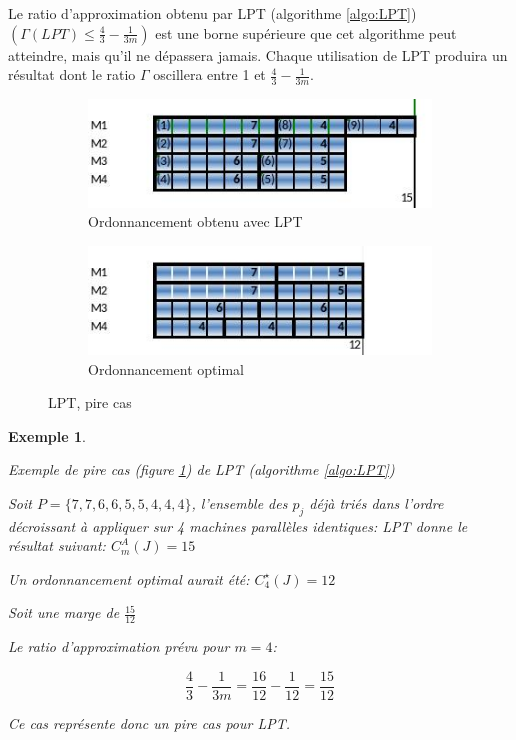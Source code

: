 \documentclass[a4paper,12pt]{report}
\theoremstyle{plain}				%
\newtheorem{example}{Exemple}
\theoremstyle{definition}				%
\begin{document}
Le ratio d'approximation obtenu par LPT (algorithme \ref{algo:LPT})
$(\Gamma(LPT)\leq \frac{4}{3} - \frac{1}{3m})$ est une borne
supérieure que cet algorithme peut atteindre, mais qu'il ne dépassera
jamais.
Chaque utilisation de LPT produira un résultat dont le ratio $\Gamma$
oscillera entre 1 et $\frac{4}{3} - \frac{1}{3m}$.
\bigskip

\begin{figure}
{\centering}
	\begin{subfigure}[b]{0.45\linewidth}
    \includegraphics[width=\linewidth]
    {Biblio_PCmax_Rendu_exLPT_Rev1.jpg}
    \caption{Ordonnancement obtenu avec LPT}
  	\end{subfigure}
\hfill%
	\begin{subfigure}[b]{0.45\linewidth}
    \includegraphics[width=\linewidth]
    {Biblio_PCmax_Rendu_exLPT_Rev2.jpg}
    \caption{Ordonnancement optimal}
  	\end{subfigure}
  	\caption{LPT, pire cas}
  	\label{fig:LPTExemplePireCas}
\end{figure}

\begin{example}
\begin{flushleft}
Exemple de pire cas (figure \ref{fig:LPTExemplePireCas}) de LPT (algorithme \ref{algo:LPT})

Soit $P=\{7,7,6,6,5,5,4,4,4\}$, l'ensemble des $p_j$ déjà triés dans
l'ordre décroissant à appliquer sur 4 machines parallèles identiques:
\bigskip
LPT donne le résultat suivant: $C_m^A(J) = 15$
\bigskip

Un ordonnancement optimal aurait été: $C_4^{\star}(J)=12$

Soit une marge de $\frac{15}{12}$

Le ratio d'approximation prévu pour $m=4$:

\[
  \frac{4}{3} - \frac{1}{3m}=\frac{16}{12} - \frac{1}{12}=\frac{15}{12}
\]

Ce cas représente donc un pire cas pour LPT.
\end{flushleft}
\label{ex:LPTExemplePireCas}
\end{example}
\end{document}
